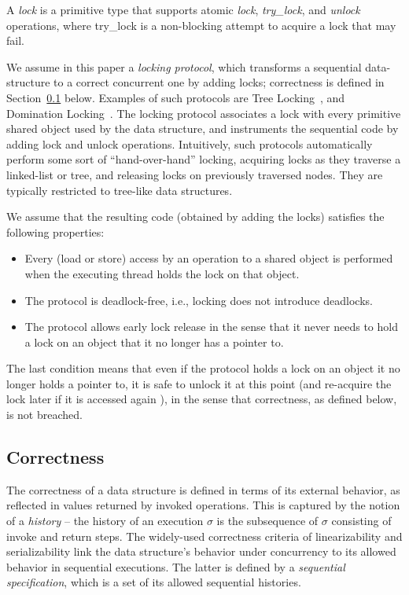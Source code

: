 A \emph{lock} is a primitive type that supports atomic \emph{lock}, \emph{try\_lock}, and \emph{unlock} operations, 
where try\_lock is a non-blocking attempt to acquire a lock that may fail. 

We assume in this paper a \emph{locking protocol}, which transforms a sequential data-structure to a correct concurrent one by adding locks;
correctness is defined in Section~\ref{ssec:linearizable} below.
Examples of such protocols are Tree Locking~\cite{SilberschatzK1980}, and Domination Locking~\cite{Gueta2011}. 
The locking protocol associates a lock with every primitive shared object used by the data structure, and instruments the sequential code 
by adding lock and unlock operations. Intuitively, such protocols automatically perform some sort of ``hand-over-hand'' locking, acquiring locks as
they traverse a linked-list or tree, and releasing locks on previously traversed nodes. They are typically restricted to tree-like data structures.


We assume that the resulting code (obtained by adding the locks) satisfies the following properties:

\begin{itemize}
\item Every (load or store) access by an operation to a shared object is performed when the executing thread holds the lock on that object.
\item The protocol is deadlock-free, i.e., locking  does not introduce deadlocks.
\item The protocol allows early lock release in the sense that  it never needs to hold a lock on an object that it no longer has a pointer to.
 \end{itemize}

The last condition means that even if the protocol holds a lock on an object it no longer holds a pointer to, it is safe to unlock it at this point (and re-acquire the lock later if it is accessed again ), in the sense that correctness, as defined below, is not breached.  


\subsection{Correctness}
\label{ssec:linearizable} 

The correctness of a data structure is defined in terms of its external behavior, as reflected in values returned by invoked operations. 
This is captured by the notion of a \emph{history} -- the history of an execution $\sigma$ is the subsequence  of $\sigma$ consisting 
of invoke and return steps. The widely-used correctness criteria of linearizability and serializability link the data structure's behavior under concurrency to its allowed behavior in sequential executions. The latter is defined by a \emph{sequential specification}, which is a set of its allowed sequential histories. 

